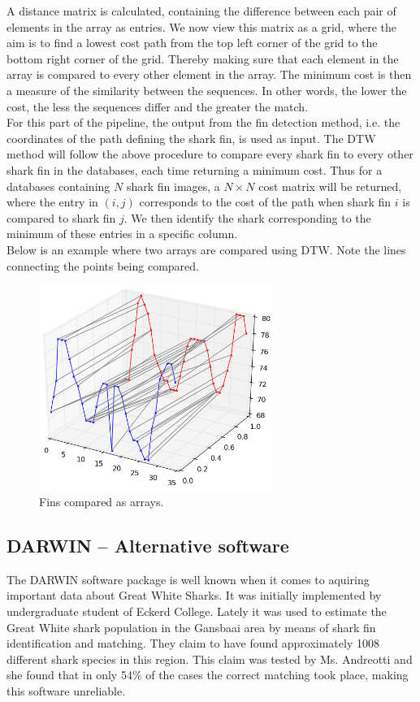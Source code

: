 \documentclass[a4paper,10pt]{article}
\newcommand{\note}{\todo}
\begin{document}
A distance matrix is calculated, containing the difference between
each pair of elements in the array as entries.  We now view this matrix as a
grid, where the
aim is to find a lowest cost path from the top left corner of the grid to the bottom right
corner of the grid.  Thereby making sure that each element in the array is compared to every other element in the array.
The minimum cost is then a measure of the similarity between the
sequences.
In other words, the lower the cost, the less the sequences differ and the greater the match.
\\

For this part of the pipeline, the output from the fin detection method,
\note{diagram! Van wat???}i.e.
the coordinates of the path defining the shark fin, is used as input.  The DTW
method will follow the above procedure to compare every shark fin to every
other shark fin in the databases, each time returning a minimum cost.  
Thus for a databases containing $N$ shark fin images, a $N \times N$ cost
matrix will be returned, where the entry in $(i, j)$ corresponds to the cost
of the path when shark fin $i$ is compared to shark fin $j$.  We then identify the shark
corresponding to the minimum of these entries in a specific column. \\


Below is an example where two arrays are compared using DTW. Note the lines
connecting the points being compared.  \begin{figure}[H]
 \centering
 \includegraphics[width=3in]{dtw.jpg}
 \caption{Fins compared as arrays.}
 \label{dtw}
\end{figure}

\newpage
\subsection{DARWIN -- Alternative software}
The DARWIN\cite{Darwin} software package is well known when it comes to
aquiring important data about Great White Sharks.  It was initially implemented
by undergraduate student of
Eckerd College.
Lately it was used to estimate the Great White shark population in the
Gansbaai area by means of shark fin identification and matching.  They claim to
have found approximately
1008 different shark species in this region.  This
claim was tested by Ms. Andreotti and she found that in only
54\% of the cases the correct matching took place, making this software
unreliable.
\end{document}
